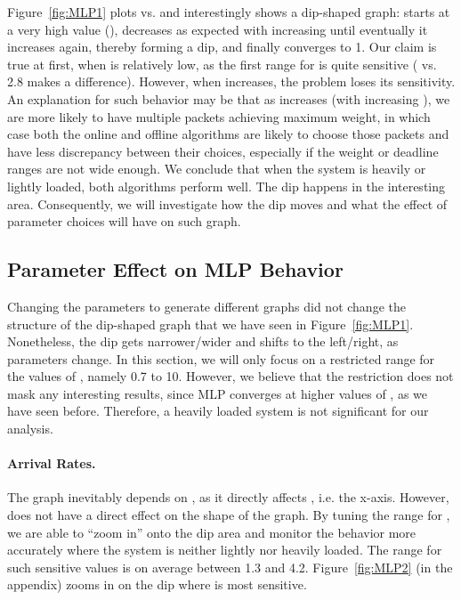 \documentclass[oribibl]{llncs}
\begin{document}
Figure~\ref{fig:MLP1} plots  vs. 
and interestingly shows a dip-shaped graph:  starts at a very high value (),
decreases as expected with increasing  until
eventually it increases again, thereby forming a dip, and finally
converges to 1. Our claim is true at first,
when  is relatively low, as the first range for  is
quite sensitive ( vs. 2.8 makes a difference). However,
when  increases, the problem loses its sensitivity. An
explanation for such behavior may be that as  increases (with
increasing ), we are more likely to have multiple packets
achieving maximum weight, in which case both the online and offline
algorithms are likely to choose those packets and have less
discrepancy between their choices, especially if the weight or
deadline ranges are not wide enough. We conclude that when the system
is heavily or lightly loaded, both algorithms perform well. The dip
happens in the interesting area. Consequently, we will investigate 
how the dip moves and what the effect of parameter choices will have
on such graph.  


\subsection {Parameter Effect on MLP Behavior}
Changing  the parameters to generate different graphs
did not change the structure of the dip-shaped graph that we have seen in Figure~\ref{fig:MLP1}. Nonetheless, the
dip gets narrower/wider and shifts to the left/right, as parameters
change.  In this
section, we will only focus on a restricted range for the values of
, namely 0.7 to 10. However, we believe that the restriction does not
mask any interesting results, since MLP converges at higher values
of , as we have seen before. Therefore, a heavily loaded
system is not significant for our analysis.   

\paragraph{Arrival Rates.} The graph inevitably depends on ,
as it directly affects , i.e. the x-axis. However,
 does not have a direct effect on the shape of the graph. By tuning the range for , we are able to ``zoom in''
onto the dip area and monitor the behavior more accurately where the
system is neither lightly nor heavily loaded. The range for such
sensitive values is on average between 1.3 and
4.2. Figure~\ref{fig:MLP2} (in the appendix) zooms in on the dip where  is most
sensitive.  
\end{document}
